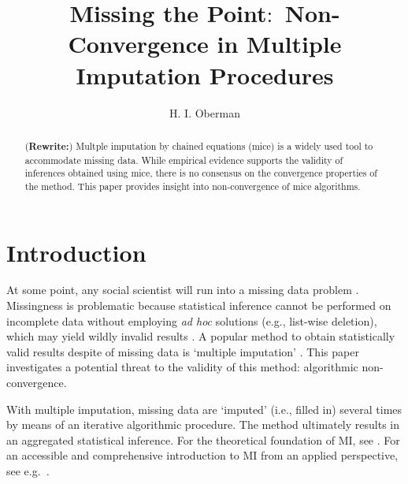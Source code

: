 \documentclass[Royal,times,sageh]{sagej}
\begin{document}
\title{Missing the Point\(\colon\) Non-Convergence in Multiple Imputation
Procedures}


\author{H. I. Oberman}




\begin{abstract}
(\textbf{Rewrite:}) Multple imputation by chained equations (mice) is a
widely used tool to accommodate missing data. While empirical evidence
supports the validity of inferences obtained using mice, there is no
consensus on the convergence properties of the method. This paper
provides insight into non-convergence of mice algorithms.
\end{abstract}


\maketitle

\hypertarget{introduction}{%
\section{Introduction}\label{introduction}}

At some point, any social scientist will run into a missing data problem
\citep{alli02}. Missingness is problematic because statistical inference
cannot be performed on incomplete data without employing \emph{ad hoc}
solutions (e.g., list-wise deletion), which may yield wildly invalid
results \citep{buur18}. A popular method to obtain statistically valid
results despite of missing data is `multiple imputation'
\citep[MI;][]{rubin87}. This paper investigates a potential threat to
the validity of this method: algorithmic non-convergence.

With multiple imputation, missing data are `imputed' (i.e., filled in)
several times by means of an iterative algorithmic procedure. The method
ultimately results in an aggregated statistical inference. For the
theoretical foundation of MI, see \citet{rubin87}. For an accessible and
comprehensive introduction to MI from an applied perspective, see
e.g.~\citet{buur18}.
\end{document}
